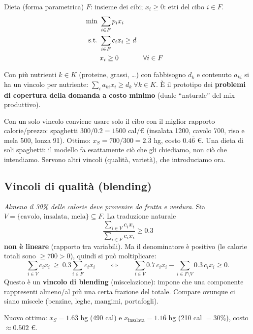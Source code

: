 \begin{modello}{Dieta (forma parametrica)}
$F$: insieme dei cibi; $x_i\ge0$: etti del cibo $i\in F$.
\begin{align*}
\min\ & \sum_{i\in F}p_ix_i\\
\text{s.t.}\ & \sum_{i\in F}c_ix_i\ge d\\
& x_i\ge 0 && \forall i\in F
\end{align*}
\end{modello}
Con più nutrienti $k\in K$ (proteine, grassi, \ldots) con fabbisogno $d_k$ e contenuto $a_{ki}$ si ha un vincolo per nutriente: $\sum_i a_{ki}x_i\ge d_k\ \forall k\in K$. È il prototipo dei \textbf{problemi di copertura della domanda a costo minimo} (duale ``naturale'' del mix produttivo).

\begin{esbox}
Con un solo vincolo conviene usare solo il cibo con il miglior rapporto calorie/prezzo: spaghetti $300/0.2=1500$ cal/\euro{} (insalata 1200, cavolo 700, riso e mela 500, lonza 91). Ottimo: $x_S=700/300=2.\overline{3}$ hg, costo $0.4\overline{6}$ \euro. Una dieta di soli spaghetti: il modello fa esattamente ciò che gli chiediamo, non ciò che intendiamo. Servono altri vincoli (qualità, varietà), che introduciamo ora.
\end{esbox}

\subsection{Vincoli di qualità (blending)}\label{sec:blending}

\emph{Almeno il 30\% delle calorie deve provenire da frutta e verdura.} Sia $V=\{\text{cavolo, insalata, mela}\}\subseteq F$. La traduzione naturale
\[ \frac{\sum_{i\in V}c_ix_i}{\sum_{i\in F}c_ix_i}\ge 0.3 \]
\textbf{non è lineare} (rapporto tra variabili). Ma il denominatore è positivo (le calorie totali sono $\ge 700>0$), quindi si può moltiplicare:
\[ \boxed{\sum_{i\in V}c_ix_i\ \ge\ 0.3\sum_{i\in F}c_ix_i} \qquad\Longleftrightarrow\qquad \sum_{i\in V}0.7\,c_ix_i-\sum_{i\in F\setminus V}0.3\,c_ix_i\ge 0. \]
Questo è un \textbf{vincolo di blending} (miscelazione): impone che una componente rappresenti almeno/al più una certa frazione del totale. Compare ovunque ci siano miscele (benzine, leghe, mangimi, portafogli).

Nuovo ottimo: $x_S=1.6\overline{3}$ hg (490 cal) e $x_{\text{insalata}}=1.1\overline{6}$ hg (210 cal $=30\%$), costo $\approx0.502$ \euro.

